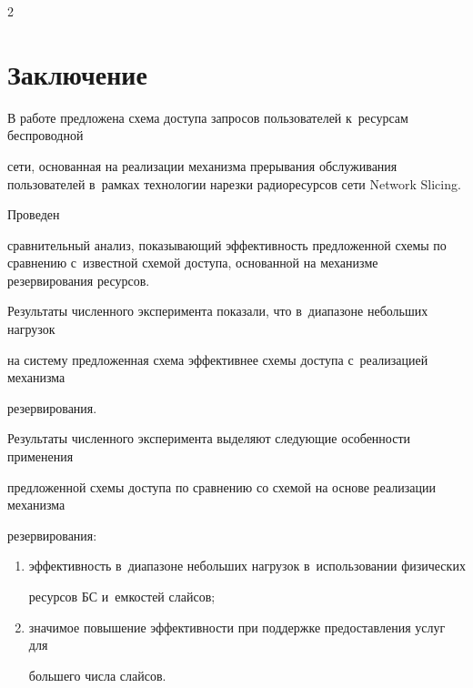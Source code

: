 \begin{multicols}{2}











\section{Заключение}







В работе предложена схема доступа запросов пользователей к~ресурсам беспроводной 


сети, основанная на реализации механизма прерывания обслуживания пользователей в~рамках технологии нарезки радиоресурсов сети Network Slicing. 





Проведен 


сравнительный анализ, по\-ка\-зы\-ва\-ющий эффективность предложенной схемы по сравнению с~известной схемой доступа, основанной на механизме резервирования ресурсов.  


Результаты численного эксперимента показали, что в~диапазоне небольших нагрузок 


на сис\-те\-му предложенная схема эффективнее схемы доступа с~реализацией механизма 


резервирования.


Результаты численного эксперимента выделяют сле\-ду\-ющие особенности применения 


предложенной схемы до\-сту\-па по сравнению со схемой на основе реализации механизма 


резервирования:


\begin{enumerate}[(1)]


\item 


эффективность в~диапазоне небольших нагрузок в~использовании физических 


ресурсов БС и~емкостей слайсов;


\item 


значимое повышение эффективности при поддержке предоставления услуг для 


большего числа слайсов.



\end{enumerate}
\end{multicols}
